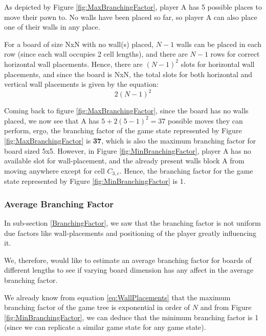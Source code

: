 As depicted by Figure \ref{fig:MaxBranchingFactor}, player A has 5 possible places to move their pawn to. No walls have been placed so far, so player A can also place one of their walls in any place.

For a board of size NxN with no wall(s) placed, $N-1$ walls can be placed in each row (since each wall occupies 2 cell lengths), and there are $N-1$ rows for correct horizontal wall placements. Hence, there are $(N-1)^2$ slots for horizontal wall placements, and since the board is NxN, the total  slots for both horizontal and vertical wall placements is given by the equation:
\begin{equation}
\label{eq:WallPlacements}
    2(N-1)^2
\end{equation}

Coming back to figure \ref{fig:MaxBranchingFactor}, since the board has no walls placed, we now see that A has $5 + 2(5-1)^2 = 37$ possible moves they can perform, ergo, the branching factor of the game state represented by Figure \ref{fig:MaxBranchingFactor} is \textbf{37}, which is also the maximum branching factor for board sized 5x5.
\newline
\newline
However, in Figure \ref{fig:MinBranchingFactor}, player A has no available slot for wall-placement, and the already present walls block A from moving anywhere except for cell \textbf{$C_{3, c}$}. Hence, the branching factor for the game state represented by Figure \ref{fig:MinBranchingFactor} is 1.

\subsubsection{Average Branching Factor}

In sub-section \ref{BranchingFactor}, we saw that the branching factor is not uniform due factors like wall-placements and positioning of the player greatly influencing it.

We, therefore, would like to estimate an average branching factor for boards of different lengths to see if varying board dimension has any affect in the average branching factor.

We already know from equation \ref{eq:WallPlacements} that the maximum branching factor of the game tree is exponential in order of $N$ and from Figure \ref{fig:MinBranchingFactor}, we can deduce that the minimum branching factor is 1 (since we can replicate a similar game state for any game state).

